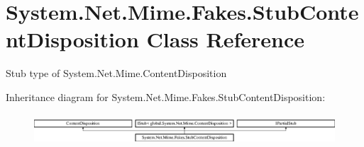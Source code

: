 \hypertarget{class_system_1_1_net_1_1_mime_1_1_fakes_1_1_stub_content_disposition}{\section{System.\-Net.\-Mime.\-Fakes.\-Stub\-Content\-Disposition Class Reference}
\label{class_system_1_1_net_1_1_mime_1_1_fakes_1_1_stub_content_disposition}
}


Stub type of System.\-Net.\-Mime.\-Content\-Disposition 


Inheritance diagram for System.\-Net.\-Mime.\-Fakes.\-Stub\-Content\-Disposition\-:\begin{figure}[H]
\begin{center}
\leavevmode
\includegraphics[height=1.185185cm]{class_system_1_1_net_1_1_mime_1_1_fakes_1_1_stub_content_disposition}
\end{center}
\end{figure}
